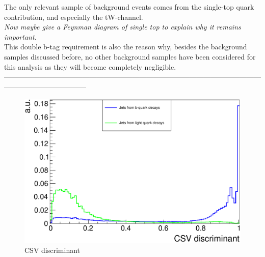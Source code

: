The only relevant sample of background events comes from the single-top quark contribution, and especially the tW-channel. \\
\textit{Now maybe give a Feynman diagram of single top to explain why it remains important.}\\
This double b-tag requirement is also the reason why, besides the background samples discussed before, no other background samples have been considered for this analysis as they will become completely negligible.
\\

-----------------------------------------------------------------------------------------------------------------------------------------------
\\


\begin{figure}[h!t]
 \centering
 \includegraphics[width = 0.85 \textwidth]{Chapters/Chapter4_EvtSel/Figures/CSVDiscr_LightAndBJets.pdf}
 \caption{CSV discriminant} \label{fig::CSVDiscr}
\end{figure}

